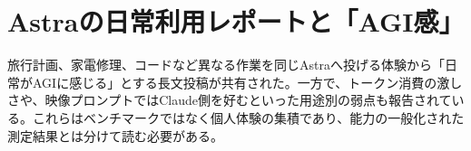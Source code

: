 \section{Astraの日常利用レポートと「AGI感」}
旅行計画、家電修理、コードなど異なる作業を同じAstraへ投げる体験から「日常がAGIに感じる」とする長文投稿が共有された。一方で、トークン消費の激しさや、映像プロンプトではClaude側を好むといった用途別の弱点も報告されている。これらはベンチマークではなく個人体験の集積であり、能力の一般化された測定結果とは分けて読む必要がある。
